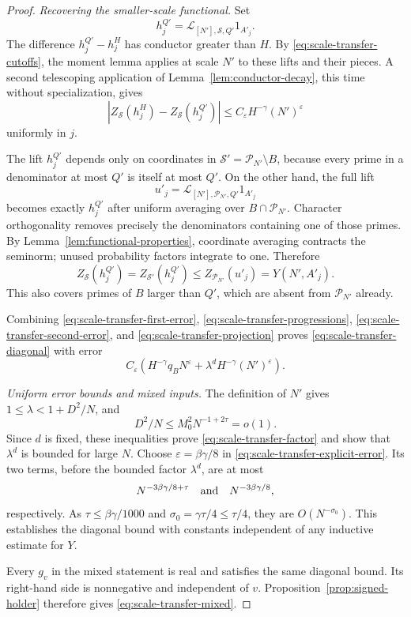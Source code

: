 \begin{proof}
\smallskip
\noindent\emph{Recovering the smaller-scale functional.}
Set
\[
 h_j^{Q'}=\mathcal L_{[N'],\mathcal S,Q'}1_{A'_j}.
\]
The difference \(h_j^{Q'}-h_j^H\) has conductor greater than \(H\).
By \eqref{eq:scale-transfer-cutoffs}, the moment lemma applies at
scale \(N'\) to these lifts and their pieces.  A second telescoping
application of Lemma~\ref{lem:conductor-decay}, this time without
specialization, gives
\begin{equation}
 |Z_{\mathcal S}(h_j^H)-Z_{\mathcal S}(h_j^{Q'})|
 \le C_\varepsilon H^{-\gamma}(N')^\varepsilon
 \label{eq:scale-transfer-second-error}
\end{equation}
uniformly in \(j\).

The lift \(h_j^{Q'}\) depends only on coordinates in
\(\mathcal S'=\mathcal P_{N'}\setminus B\), because every prime in a
denominator at most \(Q'\) is itself at most \(Q'\).
On the other hand, the full lift
\[
 u'_j=\mathcal L_{[N'],\mathcal P_{N'},Q'}1_{A'_j}
\]
becomes exactly \(h_j^{Q'}\) after uniform averaging over
\(B\cap\mathcal P_{N'}\).  Character orthogonality removes precisely
the denominators containing one of those primes.
By Lemma~\ref{lem:functional-properties}, coordinate averaging contracts
the seminorm; unused probability factors integrate to one.  Therefore
\begin{equation}
 Z_{\mathcal S}(h_j^{Q'})
 =Z_{\mathcal S'}(h_j^{Q'})
 \le Z_{\mathcal P_{N'}}(u'_j)
 =Y(N',A'_j).
 \label{eq:scale-transfer-projection}
\end{equation}
This also covers primes of \(B\) larger than \(Q'\), which are absent
from \(\mathcal P_{N'}\) already.

Combining \eqref{eq:scale-transfer-first-error},
\eqref{eq:scale-transfer-progressions},
\eqref{eq:scale-transfer-second-error}, and
\eqref{eq:scale-transfer-projection} proves
\eqref{eq:scale-transfer-diagonal} with error
\begin{equation}
 C_\varepsilon\left(
 H^{-\gamma}q_BN^\varepsilon+
 \lambda^dH^{-\gamma}(N')^\varepsilon\right).
 \label{eq:scale-transfer-explicit-error}
\end{equation}

\smallskip
\noindent\emph{Uniform error bounds and mixed inputs.}
The definition of \(N'\) gives
\(1\le\lambda<1+D^2/N\), and
\[
 D^2/N\le M_0^2N^{-1+2\tau}=o(1).
\]
Since \(d\) is fixed, these inequalities prove
\eqref{eq:scale-transfer-factor} and show that \(\lambda^d\)
is bounded for large \(N\).
Choose \(\varepsilon=\beta\gamma/8\) in
\eqref{eq:scale-transfer-explicit-error}.  Its two terms, before
the bounded factor \(\lambda^d\), are at most
\[
 N^{-3\beta\gamma/8+\tau}
 \quad\hbox{and}\quad N^{-3\beta\gamma/8},
\]
respectively.  As
\(\tau\le\beta\gamma/1000\) and
\(\sigma_0=\gamma\tau/4\le\tau/4\), they are
\(O(N^{-\sigma_0})\).  This establishes the diagonal bound with
constants independent of any inductive estimate for \(Y\).

Every \(g_v\) in the mixed statement is real and satisfies the same
diagonal bound.  Its right-hand side is nonnegative and independent
of \(v\).  Proposition~\ref{prop:signed-holder} therefore gives
\eqref{eq:scale-transfer-mixed}.
\end{proof}


